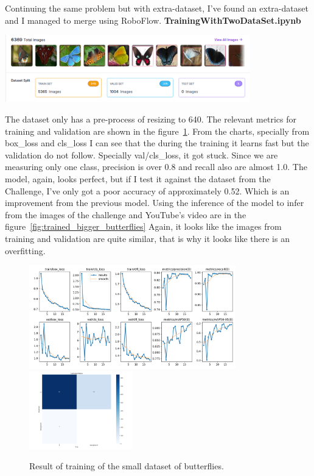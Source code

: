 \documentclass{cpsc202}
\begin{document}
    \newpage
    Continuing the same problem but with extra-dataset, I've found an extra-dataset and I managed to merge using RoboFlow.
    \Large\textbf{TrainingWithTwoDataSet.ipynb}
    \begin{center}
        \includegraphics[width=0.8\textwidth]{trained_bigger_butterflies/dataset_enhanced}
    \end{center}
    The dataset only has a pre-process of resizing to 640.
    The relevant metrics for training and validation are shown in the figure~\ref{fig:results-big}.
    From the charts, specially from box\_loss and cls\_loss I can see that the during the training it learns fast but the validation do not follow.
    Specially val/cls\_loss, it got stuck.
    Since we are measuring only one class, precision is over 0.8 and recall also are almost 1.0.
    The model, again,  looks perfect, but if I test it against the dataset from the Challenge, I've only got a poor accuracy of approximately 0.52.
    Which is an improvement from the previous model.
    Using the inference of the model to infer from the images of the challenge and YouTube's video are in the figure~\ref{fig:trained_bigger_butterflies}
    Again, it looks like the images from training and validation are quite similar, that is why it looks like there is an overfitting.
    \begin{figure}
        \begin{center}
            \includegraphics[width=0.8\textwidth]{trained_bigger_butterflies/results}
            \includegraphics[width=0.4\textwidth]{trained_bigger_butterflies/confusion_matrix}
        \end{center}
        \caption{Result of training of the small dataset of butterflies.}
        \label{fig:results-big}
    \end{figure}
\end{document}
